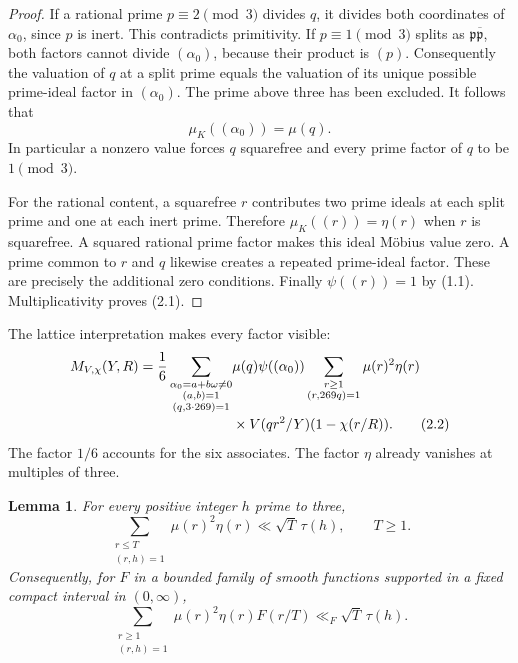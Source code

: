 \documentclass[11pt]{article}
\newtheorem{lemma}[theorem]{Lemma}
\begin{document}
\begin{proof}
If a rational prime $p\equiv2\pmod3$ divides $q$, it divides
both coordinates of $\alpha_0$, since $p$ is inert.
This contradicts primitivity. If $p\equiv1\pmod3$ splits as
$\mathfrak p\overline{\mathfrak p}$, both factors cannot divide
$(\alpha_0)$, because their product is $(p)$.
Consequently the valuation of $q$ at a split prime equals the
valuation of its unique possible prime-ideal factor in
$(\alpha_0)$. The prime above three has been excluded.
It follows that
\[
                   \mu_K((\alpha_0))=\mu(q).
\]
In particular a nonzero value forces $q$ squarefree and every
prime factor of $q$ to be $1\pmod3$.

For the rational content, a squarefree $r$ contributes two prime
ideals at each split prime and one at each inert prime. Therefore
$\mu_K((r))=\eta(r)$ when $r$ is squarefree. A squared rational
prime factor makes this ideal M\"obius value zero.
A prime common to $r$ and $q$ likewise creates a repeated
prime-ideal factor. These are precisely the additional zero
conditions. Finally $\psi((r))=1$ by (1.1). Multiplicativity
proves (2.1).
\end{proof}

The lattice interpretation makes every factor visible:
\begin{align}
 M_{V,\chi}(Y,R)
 =\frac16\sum_{\substack{\alpha_0=a+b\omega\ne0\\
                         (a,b)=1\\(q,3\cdot269)=1}}
 &\mu(q)\psi((\alpha_0))
 \sum_{\substack{r\ge1\\(r,269q)=1}}
      \mu(r)^2\eta(r) \notag\\[-2pt]
 &{}\times V(qr^2/Y)(1-\chi(r/R)).                        \tag{2.2}
\end{align}
The factor $1/6$ accounts for the six associates.
The factor $\eta$ already vanishes at multiples of three.

\begin{lemma}\label{lem:scalar}
For every positive integer $h$ prime to three,
\[
 \sum_{\substack{r\le T\\(r,h)=1}}\mu(r)^2\eta(r)
                      \ll \sqrt T\,\tau(h),\qquad T\ge1. \tag{2.3}
\]
Consequently, for $F$ in a bounded family of smooth functions
supported in a fixed compact interval in $(0,\infty)$,
\[
 \sum_{\substack{r\ge1\\(r,h)=1}}\mu(r)^2\eta(r)F(r/T)
                      \ll_F \sqrt T\,\tau(h).            \tag{2.4}
\]
\end{lemma}
\end{document}
